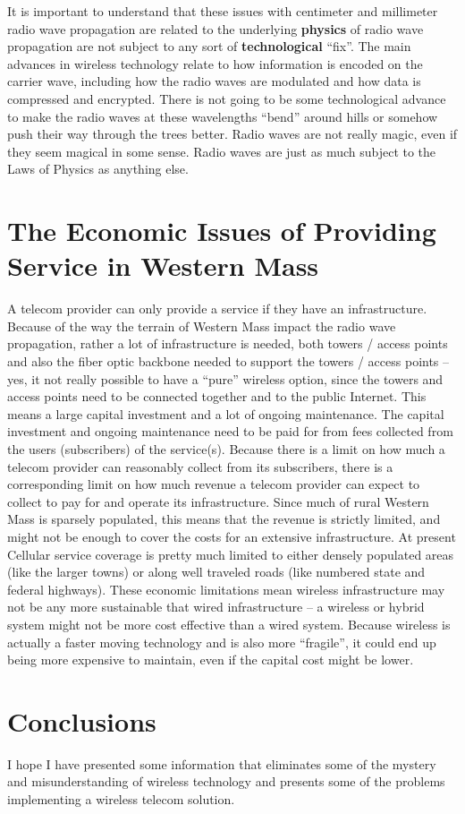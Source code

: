 \documentclass[12pt]{article}
\begin{document}
It is important to understand that these issues with centimeter and millimeter 
radio wave propagation are related to the underlying \textbf{physics} of radio 
wave propagation are not subject to any sort of \textbf{technological} 
``fix''.  The main advances in wireless technology relate to how information 
is encoded on the carrier wave, including how the radio waves are modulated 
and how data is compressed and encrypted.  There is not going to be some 
technological advance to make the radio waves at these wavelengths ``bend'' 
around hills or somehow push their way through the trees better.  Radio waves 
are not really magic, even if they seem magical in some sense.  Radio waves 
are just as much subject to the Laws of Physics as anything else.

\section{The Economic Issues of Providing Service in Western Mass}

A telecom provider can only provide a service if they have an infrastructure.
Because of the way the terrain of Western Mass impact the radio wave
propagation, rather a lot of infrastructure is needed, both towers / access
points and also the fiber optic backbone needed to support the towers / access
points -- yes, it not really possible to have a ``pure'' wireless option,
since the towers and access points need to be connected together and to the
public Internet. This means a large capital investment and a lot of ongoing
maintenance. The capital investment and ongoing maintenance need to be paid
for from fees collected from the users (subscribers) of the service(s).
Because there is a limit on how much a telecom provider can reasonably collect
from its subscribers, there is a corresponding limit on how much revenue a
telecom provider can expect to collect to pay for and operate its
infrastructure. Since much of rural Western Mass is sparsely populated, this
means that the revenue is strictly limited, and might not be enough to cover
the costs for an extensive infrastructure. At present Cellular service
coverage is pretty much limited to either densely populated areas (like the
larger towns) or along well traveled roads (like numbered state and federal
highways).  These economic limitations mean wireless infrastructure may not be 
any more sustainable that wired infrastructure -- a wireless or hybrid system 
might not be more cost effective than a wired system.  Because wireless is 
actually a faster moving technology and is also more ``fragile'', it could end 
up being more expensive to maintain, even if the capital cost might be lower. 

\section{Conclusions}

I hope I have presented some information that eliminates some of the mystery 
and misunderstanding of wireless technology and presents some of the problems 
implementing a wireless telecom solution.


\appendix
\cleardoublepage
{}


\end{document}
